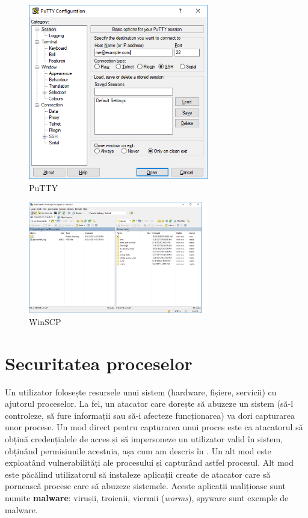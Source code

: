 \begin{figure}[!htbp]
  \centering
  \includegraphics[width=0.7\textwidth]{chapters/12-sec/img/putty.png}
  \caption{PuTTY}
  \label{fig:sec:putty}
\end{figure}

\begin{figure}[!htbp]
  \centering
  \includegraphics[width=0.7\textwidth]{chapters/12-sec/img/winscp.png}
  \caption{WinSCP}
  \label{fig:sec:winscp}
\end{figure}

\section{Securitatea proceselor}
\label{sec:sec:process}

Un utilizator folosește resursele unui sistem (hardware, fișiere, servicii) cu ajutorul proceselor. La fel, un atacator care dorește să abuzeze un sistem (să-l controleze, să fure informații sau să-i afecteze funcționarea) va dori capturarea unor procese. Un mod direct pentru capturarea unui proces este ca atacatorul să obțină credențialele de acces și să impersoneze un utilizator valid în sistem, obținând permisiunile acestuia, așa cum am descris în . Un alt mod este exploatând vulnerabilități ale procesului și capturând astfel procesul. Alt mod este păcălind utilizatorul să instaleze aplicații create de atacator care să pornească procese care să abuzeze sistemele. Aceste aplicații malițioase sunt numite \textbf{malware}: virușii, troienii, viermii (\textit{worms}), spyware sunt exemple de malware.

